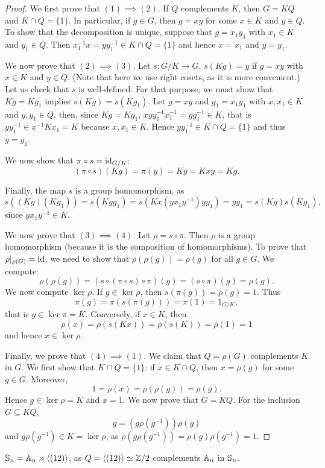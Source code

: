 \begin{proof}
We first prove that $(1)\implies(2)$. If $Q$ complements $K$, then $G=KQ$ and
$K\cap Q=\{1\}$. In particular, if $g\in G$, then $g=xy$ for some $x\in K$ and $y\in Q$. To show that
the decomposition is unique, suppose that 
$g=x_1y_1$ with $x_1\in K$ and $y_1\in Q$. Then $x_1^{-1}x=yy_1^{-1}\in K\cap Q=\{1\}$ 
and hence $x=x_1$ and $y=y_1$.


We now prove that $(2)\implies(3)$. Let $s\colon G/K\to G$, $s(Kg)=y$ if 
$g=xy$ with $x\in K$ and $y\in Q$. (Note that here we use right cosets, as it is more convenient.)
Let us check that $s$ is well-defined. 
For that purpose, we must show that $Kg=Kg_1$ implies $s(Kg)=s(Kg_1)$. Let $g=xy$ 
and $g_1=x_1y_1$ with $x,x_1\in K$ and $y,y_1\in Q$, then, since $Kg=Kg_1$, 
$xyy_1^{-1}x_1^{-1}=gg_1^{-1}\in K$, that is $yy_1^{-1}\in x^{-1}Kx_1=K$
 because $x,x_1\in K$. Hence $yy_1^{-1}\in K\cap Q=\{1\}$ and thus $y=y_1$. 
 
 We now show that $\pi\circ
 s=\operatorname{id}_{G/K}$:
\[
(\pi\circ s)(Kg)=\pi(y)=Ky=Kxy=Kg.
\]

Finally, the map 
$s$ is a group homomorphism, as 
\[
s((Kg)(Kg_1))=s(Kgg_1)=s(Kx(yx_1y^{-1})yy_1)=yy_1=s(Kg)s(Kg_1),
\]
since $yx_1y^{-1}\in K$. 


We now prove that $(3)\implies(4)$. Let $\rho=s\circ\pi$. Then $\rho$ is a group homomorphism (because it is the composition of homomorphisms). 
To prove that $\rho|_{\rho(G)}=\operatorname{id}$, we need to show that $\rho(\rho(g))=\rho(g)$ for all $g\in G$. 
We compute: 
\[
\rho(\rho(g))=(s\circ(\pi\circ s)\circ\pi)(g)=(s\circ\pi)(g)=\rho(g).
\]
We now compute $\ker\rho$. If $g\in\ker\rho$, then $s(\pi(g))=\rho(g)=1$. Thus 
\[
\pi(g)=\pi(s(\pi(g)))=\pi(1)=1_{G/K},
\]
that is $g\in\ker\pi=K$. Conversely, if $x\in K$, then
\[
\rho(x)=\rho(s(Kx))=\rho(s(K))=\rho(1)=1
\]
and hence $x\in\ker\rho$.

Finally, we prove that $(4)\implies(1)$. We claim that $Q=\rho(G)$ complements $K$ in
 $G$. We first show that $K\cap Q=\{1\}$: if $x\in K\cap Q$, then $x=\rho(g)$ for some $g\in G$. Moreover, 
\[
1=\rho(x)=\rho(\rho(g))=\rho(g).
\]
Hence $g\in\ker\rho=K$ and $x=1$. We now prove that $G=KQ$. For the inclusion $G\subseteq KQ$, 
\[
g=(g\rho(g^{-1}))\rho(g)
\]
and $g\rho(g^{-1})\in K=\ker\rho$, as $\rho(g\rho(g^{-1}))=  \rho(g)\rho(g^{-1})=1$.
\end{proof}

\begin{example}
$\mathbb{S}_n=\mathbb{A}_n\rtimes\langle(12)\rangle$, as $Q=\langle (12)\rangle\simeq\mathbb{Z}/2$ complements 
$\mathbb{A}_n$ in $\mathbb{S}_n$.
\end{example}

